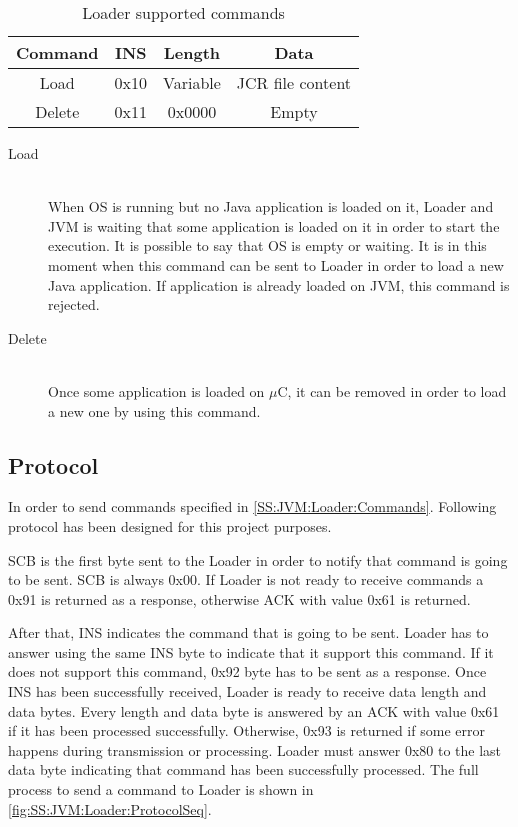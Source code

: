 \begin{table}[!htb]
\centering
\begin{tabular}{|c|c|c|c|}
\hline 
Command & INS & Length & Data \\ 
\hline 
Load & 0x10 & Variable & JCR file content \\ 
\hline 
Delete & 0x11 & 0x0000 & Empty \\ 
\hline 
\end{tabular}
\caption{Loader supported commands}
\label{tab:SS:JVM:Loader:Commands}
\end{table}

\begin{description}
\item[Load] \hfill \\
When OS is running but no Java application is loaded on it, Loader and JVM is waiting that some application is loaded on it in order to start the execution. It is possible to say that OS is empty or waiting. It is in this moment when this command can be sent to Loader in order to load a new Java application. If application is already loaded on JVM, this command is rejected.
\item[Delete] \hfill \\
Once some application is loaded on $\mu$C, it can be removed in order to load a new one by using this command.
\end{description}

\subsection{Protocol}\label{SS:JVM:Loader:Protocol}
In order to send commands specified in \ref{SS:JVM:Loader:Commands}. Following protocol has been designed for this project purposes.

SCB is the first byte sent to the Loader in order to notify that command is going to be sent. SCB is always 0x00. If Loader is not ready to receive commands a 0x91 is returned as a response, otherwise ACK with value 0x61 is returned.

After that, INS indicates the command that is going to be sent. Loader has to answer using the same INS byte to indicate that it support this command. If it does not support this command, 0x92 byte has to be sent as a response.
Once INS has been successfully received, Loader is ready to receive data length and data bytes. Every length and data byte is answered by an ACK with value 0x61 if it has been processed successfully. Otherwise, 0x93 is returned if some error happens during transmission or processing. Loader must answer 0x80 to the last data byte indicating that command has been successfully processed. The full process to send a command to Loader is shown in \ref{fig:SS:JVM:Loader:ProtocolSeq}.

